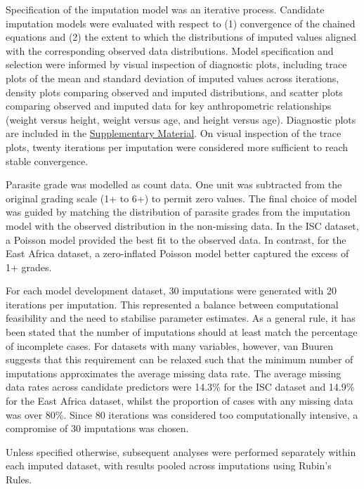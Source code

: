 Specification of the imputation model was an iterative process. Candidate imputation models were evaluated with respect to (1) convergence of the chained equations and (2) the extent to which the distributions of imputed values aligned with the corresponding observed data distributions. Model specification and selection were informed by visual inspection of diagnostic plots, including trace plots of the mean and standard deviation of imputed values across iterations, density plots comparing observed and imputed distributions, and scatter plots comparing observed and imputed data for key anthropometric relationships (weight versus height, weight versus age, and height versus age). Diagnostic plots are included in the \href{https://github.com/jpwil/dphil/tree/main/ch3/missing_diagnostics/}{Supplementary Material}. On visual inspection of the trace plots, twenty iterations per imputation were considered more sufficient to reach stable convergence.

Parasite grade was modelled as count data. One unit was subtracted from the original grading scale (1+ to 6+) to permit zero values. The final choice of model was guided by matching the distribution of parasite grades from the imputation model with the observed distribution in the non-missing data. In the ISC dataset, a Poisson model provided the best fit to the observed data. In contrast, for the East Africa dataset, a zero-inflated Poisson model better captured the excess of 1+ grades.

For each model development dataset, 30 imputations were generated with 20 iterations per imputation. This represented a balance between computational feasibility and the need to stabilise parameter estimates. As a general rule, it has been stated that the number of imputations should at least match the percentage of incomplete cases\cite{white2011}. For datasets with many variables, however, van Buuren suggests that this requirement can be relaxed such that the minimum number of imputations approximates the average missing data rate\cite{van-buuren2011}. The average missing data rates across candidate predictors were 14.3\% for the ISC dataset and 14.9\% for the East Africa dataset, whilst the proportion of cases with any missing data was over 80\%. Since 80 iterations was considered too computationally intensive, a compromise of 30 imputations was chosen.

Unless specified otherwise, subsequent analyses were performed separately within each imputed dataset, with results pooled across imputations using Rubin's Rules\cite{rubin1987}.

